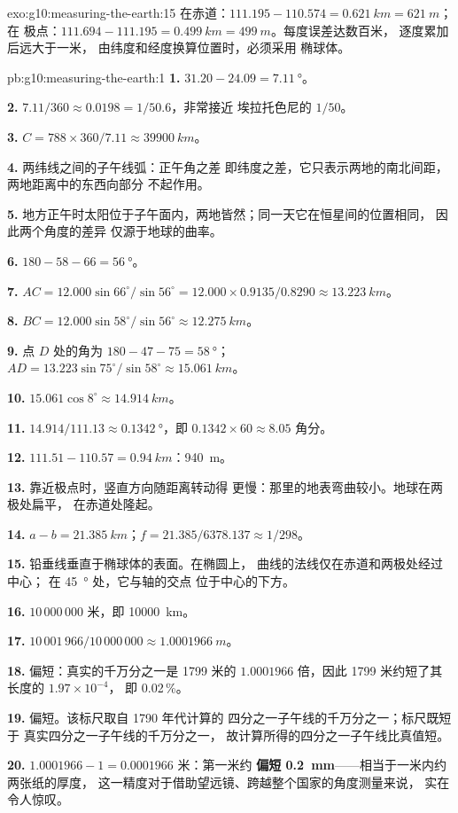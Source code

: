 \begin{solution}{exo:g10:measuring-the-earth:15}
在赤道：$111.195 - 110.574 = \qty{0.621}{km} = \qty{621}{m}$；在
极点：$111.694 - 111.195 = \qty{0.499}{km} = \qty{499}{m}$。每度误差达数百米，
逐度累加后远大于一米，
由纬度和经度换算位置时，必须采用
椭球体。
\end{solution}

\begin{solution}{pb:g10:measuring-the-earth:1}
\textbf{1.} $31.20 - 24.09 = \qty{7.11}{\degree}$。

\textbf{2.} $7.11/360 \approx 0.0198 = 1/50.6$，非常接近
埃拉托色尼的 $1/50$。

\textbf{3.} $C = 788 \times 360/7.11 \approx \qty{39900}{km}$。

\textbf{4.} 两纬线之间的子午线弧：正午角之差
即纬度之差，它只表示两地的南北间距，
两地距离中的东西向部分
不起作用。

\textbf{5.} 地方正午时太阳位于子午面内，两地皆然；同一天它在恒星间的位置相同，
因此两个角度的差异
仅源于地球的曲率。

\textbf{6.} $180 - 58 - 66 = \qty{56}{\degree}$。

\textbf{7.} $AC = 12.000 \sin 66^\circ/\sin 56^\circ = 12.000 \times
0.9135/0.8290 \approx \qty{13.223}{km}$。

\textbf{8.} $BC = 12.000 \sin 58^\circ/\sin 56^\circ \approx \qty{12.275}{km}$。

\textbf{9.} 点 $D$ 处的角为 $180 - 47 - 75 = \qty{58}{\degree}$；
$AD = 13.223 \sin 75^\circ/\sin 58^\circ \approx \qty{15.061}{km}$。

\textbf{10.} $15.061 \cos 8^\circ \approx \qty{14.914}{km}$。

\textbf{11.} $14.914/111.13 \approx \qty{0.1342}{\degree}$，即
$0.1342 \times 60 \approx 8.05$ 角分。

\textbf{12.} $111.51 - 110.57 = \qty{0.94}{km}$：\qty{940}{m}。

\textbf{13.} 靠近极点时，竖直方向随距离转动得
更慢：那里的地表弯曲较小。地球在两极处扁平，
在赤道处隆起。

\textbf{14.} $a - b = \qty{21.385}{km}$；$f = 21.385/6378.137 \approx 1/298$。

\textbf{15.} 铅垂线垂直于椭球体的表面。在椭圆上，
曲线的法线仅在赤道和两极处经过中心；
在 \qty{45}{\degree} 处，它与轴的交点
位于中心的下方。

\textbf{16.} $10\,000\,000$ 米，即 \qty{10000}{km}。

\textbf{17.} $10\,001\,966/10\,000\,000 \approx \qty{1.0001966}{m}$。

\textbf{18.} 偏短：真实的千万分之一是 1799 米的
$1.0001966$ 倍，因此 1799 米约短了其长度的 $1.97 \times 10^{-4}$，
即 0.02\,\%。

\textbf{19.} 偏短。该标尺取自 1790 年代计算的
四分之一子午线的千万分之一；标尺既短于
真实四分之一子午线的千万分之一，
故计算所得的四分之一子午线比真值短。

\textbf{20.} $1.0001966 - 1 = 0.0001966$ 米：第一米约
\textbf{偏短 \qty{0.2}{mm}}——相当于一米内约两张纸的厚度，
这一精度对于借助望远镜、跨越整个国家的角度测量来说，
实在令人惊叹。
\end{solution}
